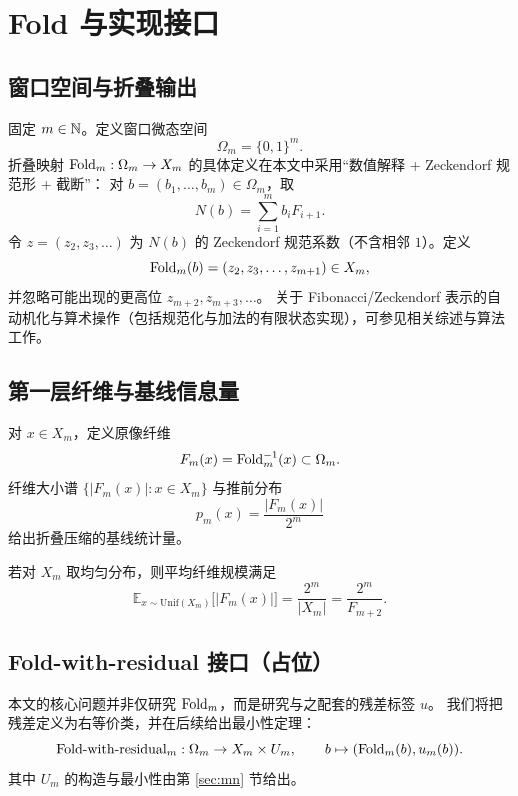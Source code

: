 \section{Fold 与实现接口}\label{sec:fold}

\subsection{窗口空间与折叠输出}
固定 $m\in\mathbb{N}$。定义窗口微态空间
\[
\Omega_m=\{0,1\}^m.
\]
折叠映射 $\mathrm{Fold}_m:\Omega_m\to X_m$ 的具体定义在本文中采用“数值解释 + Zeckendorf 规范形 + 截断”：
对 $b=(b_1,\dots,b_m)\in\Omega_m$，取
\[
N(b)=\sum_{i=1}^{m} b_i F_{i+1}.
\]
令 $z=(z_2,z_3,\dots)$ 为 $N(b)$ 的 Zeckendorf 规范系数（不含相邻 $1$）。定义
\[
\mathrm{Fold}_m(b)=(z_2,z_3,\dots,z_{m+1})\in X_m,
\]
并忽略可能出现的更高位 $z_{m+2},z_{m+3},\dots$。
关于 Fibonacci/Zeckendorf 表示的自动机化与算术操作（包括规范化与加法的有限状态实现），可参见相关综述与算法工作。\cite{Frougny1991FibonacciAutomata,AhlbachEtAl2013ZeckendorfArithmetic,AlloucheShallit2003AutomaticSequences}

\subsection{第一层纤维与基线信息量}
对 $x\in X_m$，定义原像纤维
\[
F_m(x)=\mathrm{Fold}_m^{-1}(x)\subset\Omega_m.
\]
纤维大小谱 $\{|F_m(x)|:x\in X_m\}$ 与推前分布
\[
p_m(x)=\frac{|F_m(x)|}{2^m}
\]
给出折叠压缩的基线统计量。

\begin{proposition}[平均纤维规模]\label{prop:avg_fiber}
若对 $X_m$ 取均匀分布，则平均纤维规模满足
\[
\mathbb E_{x\sim \mathrm{Unif}(X_m)}\bigl[|F_m(x)|\bigr]=\frac{2^m}{|X_m|}=\frac{2^m}{F_{m+2}}.
\]
\end{proposition}

\subsection{Fold-with-residual 接口（占位）}
本文的核心问题并非仅研究 $\mathrm{Fold}_m$，而是研究与之配套的残差标签 $u$。
我们将把残差定义为右等价类，并在后续给出最小性定理：
\[
\mathrm{Fold}\text{-with-residual}_m:\Omega_m\to X_m\times U_m,\qquad b\mapsto(\mathrm{Fold}_m(b),u_m(b)).
\]
其中 $U_m$ 的构造与最小性由第 \ref{sec:mn} 节给出。

